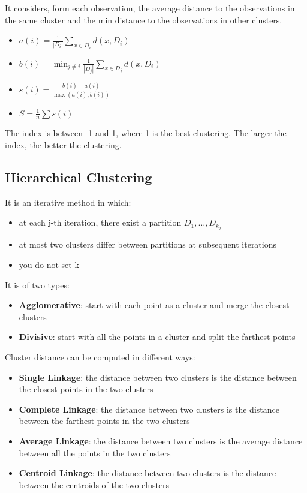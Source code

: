 \begin{exampleblock}
It considers, form each observation, the average distance to the observations in the same cluster and the min distance to the observations in other clusters.
\begin{itemize}
    \item $a(i) = \frac{1}{|D_i|} \sum_{x \in D_i} d(x,D_i)$
    \item $b(i) = \min_{j \neq i} \frac{1}{|D_j|} \sum_{x \in D_j} d(x,D_i)$
    \item $s(i) = \frac{b(i)-a(i)}{\max(a(i),b(i))}$
    \item $S = \frac{1}{n} \sum s(i)$
\end{itemize}
The index is between -1 and 1, where 1 is the best clustering. The larger the index, the better the clustering.
\end{exampleblock}

\newpage
\subsection{Hierarchical Clustering}

\begin{definitionblock}
It is an iterative method in which:
\begin{itemize}
    \item at each j-th iteration, there exist a partition $D_1,\dots,D_{k_j}$
    \item at most two clusters differ between partitions at subsequent iterations
    \item you do not set k 
\end{itemize}
It is of two types:
\begin{itemize}
    \item \textbf{Agglomerative}: start with each point as a cluster and merge the closest clusters
    \item \textbf{Divisive}: start with all the points in a cluster and split the farthest points
\end{itemize}
\end{definitionblock}

Cluster distance can be computed in different ways:
\begin{itemize}
    \item \textbf{Single Linkage}: the distance between two clusters is the distance between the closest points in the two clusters
    \item \textbf{Complete Linkage}: the distance between two clusters is the distance between the farthest points in the two clusters
    \item \textbf{Average Linkage}: the distance between two clusters is the average distance between all the points in the two clusters
    \item \textbf{Centroid Linkage}: the distance between two clusters is the distance between the centroids of the two clusters
\end{itemize}

